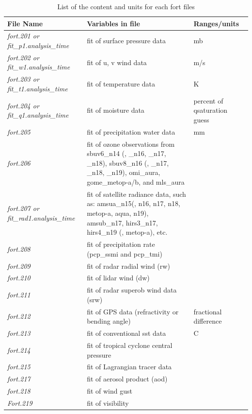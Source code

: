 \begin{table}[htbp]
\centering
\caption{List of the content and units for each fort files}
\begin{tabular}{|p{4cm}|p{7cm}|p{3cm}|}
\hline
\hline
File Name & Variables in file & Ranges/units \\
\hline
\textit{fort.201 or fit\_p1.analysis\_time} & fit of surface pressure data & mb \\
\hline
\textit{fort.202 or fit\_w1.analysis\_time} & fit of u, v wind data & m/s \\
\hline
\textit{fort.203 or fit\_t1.analysis\_time} & fit of temperature data & K \\
\hline
\textit{fort.204 or fit\_q1.analysis\_time} & fit of moisture data & percent of qsaturation guess \\
\hline
\textit{fort.205} & fit of precipitation water data & mm \\
\hline
\textit{fort.206} & fit of ozone observations from sbuv6\_n14 (, \_n16, \_n17, \_n18), sbuv8\_n16 (, \_n17, \_n18, \_n19), omi\_aura, gome\_metop-a/b, and mls\_aura &  \\
\hline
\textit{fort.207 or fit\_rad1.analysis\_time} & fit of satellite radiance data, such as:
amsua\_n15(, n16, n17, n18, metop-a, aqua, n19), amsub\_n17, hirs3\_n17, hirs4\_n19 (, metop-a), etc. & \\
\hline	
\textit{fort.208} & fit of precipitation rate (pcp\_ssmi and pcp\_tmi) & \\	
\hline
\textit{fort.209} & fit of radar radial wind (rw) & \\
\hline
\textit{fort.210} & fit of lidar wind (dw) & \\
\hline
\textit{fort.211} & fit of radar superob wind data (srw) & \\
\hline	
\textit{fort.212} & fit of GPS data (refractivity or bending angle) & fractional difference \\
\hline
\textit{fort.213} & fit of conventional sst data & C \\
\hline
\textit{fort.214} & fit of tropical cyclone central pressure &  \\
\hline
\textit{fort.215} & fit of Lagrangian tracer data &  \\
\hline
\textit{fort.217} & fit of aerosol product (aod) &  \\
\hline	
\textit{fort.218} & fit of wind gust &  \\
\hline	
\textit{Fort.219} & fit of visibility &
 \\
\hline
\end{tabular}
\label{tab45}
\end{table} 

